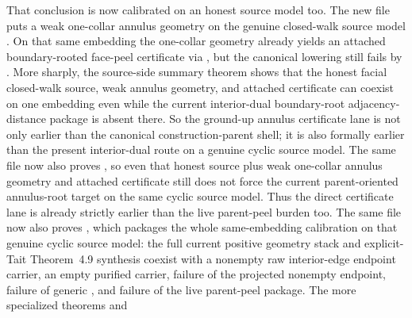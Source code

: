 \documentclass[11pt]{article}
\begin{document}
That conclusion is now calibrated on an honest source model too.  The new file
 puts a weak
one-collar annulus geometry  on the
genuine closed-walk source model .  On that
same embedding the one-collar geometry already yields an attached
boundary-rooted face-peel certificate via
,
but the canonical lowering
 still fails
 by
.
More sharply, the source-side summary theorem
shows that the honest facial closed-walk source, weak annulus geometry, and
attached certificate can coexist on one embedding even while the current
interior-dual boundary-root adjacency-distance package is absent there.  So
the ground-up annulus certificate lane is not only earlier than the canonical
construction-parent shell; it is also formally earlier than the present
interior-dual route on a genuine cyclic source model.  The same file now also
proves
,
so even that honest source plus weak one-collar annulus geometry and attached
certificate still does not force the current parent-oriented annulus-root
target on the same cyclic source model.  Thus the direct certificate lane is
already strictly earlier than the live parent-peel burden too.  The same file
now also proves
,
which packages the whole same-embedding calibration on that genuine cyclic
source model: the full current positive geometry stack and explicit-Tait
Theorem~4.9 synthesis coexist with a nonempty raw interior-edge endpoint
carrier, an empty purified carrier, failure of the projected nonempty
endpoint, failure of generic
, and failure of the live
parent-peel package.  The more specialized theorems
and
\end{document}
